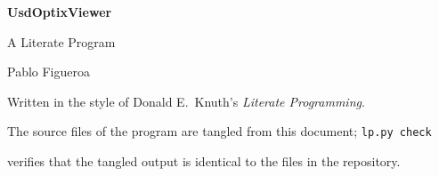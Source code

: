 \documentclass[10pt]{article}
\begin{document}
\begin{titlepage}
  \centering
  \vspace*{5cm}
  {\Huge\bfseries UsdOptixViewer\par}
  \vspace{0.8em}
  {\Large A Literate Program\par}
  \vspace{2.5em}
  {\large Pablo Figueroa\par}
  \vfill
  {\small Written in the style of Donald E.\ Knuth's \emph{Literate Programming}.\par
   The source files of the program are tangled from this document; \texttt{lp.py check}\par
   verifies that the tangled output is identical to the files in the repository.\par}
  \vspace{2cm}
\end{titlepage}
\tableofcontents
\clearpage
{}
\end{document}
